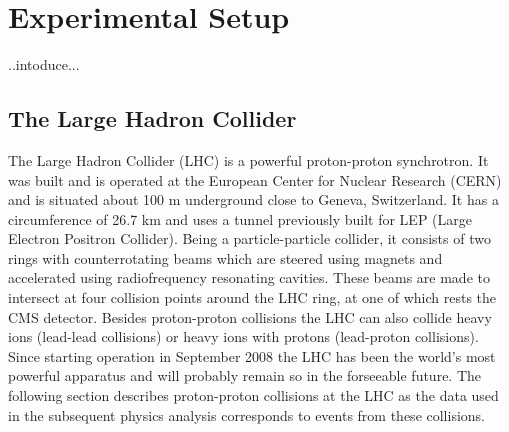 %
%
%
%
%
%
%
%
%
%

%
%

\chapter{Experimental Setup}
\label{chap:exper_setup}
..intoduce...
\section{The Large Hadron Collider}
\label{sec:LHC}

The Large Hadron Collider (LHC) is a powerful proton-proton synchrotron. It was built and is operated at the European Center for Nuclear Research (CERN) and is situated about 100 m underground close to Geneva, Switzerland. It has a circumference of 26.7 km and uses a tunnel previously built for LEP (Large Electron Positron Collider). Being a particle-particle collider, it consists of two rings with counterrotating beams which are steered using magnets and accelerated using radiofrequency resonating cavities. These beams are made to intersect at four collision points around the LHC ring, at one of which rests the CMS detector. Besides proton-proton collisions the LHC can also collide heavy ions (lead-lead collisions) or heavy ions with protons (lead-proton collisions). Since starting operation in September 2008 the LHC has been the world's most powerful apparatus and will probably remain so in the forseeable future. The following section describes proton-proton collisions at the LHC as the data used in the subsequent physics analysis corresponds to events from these collisions.

